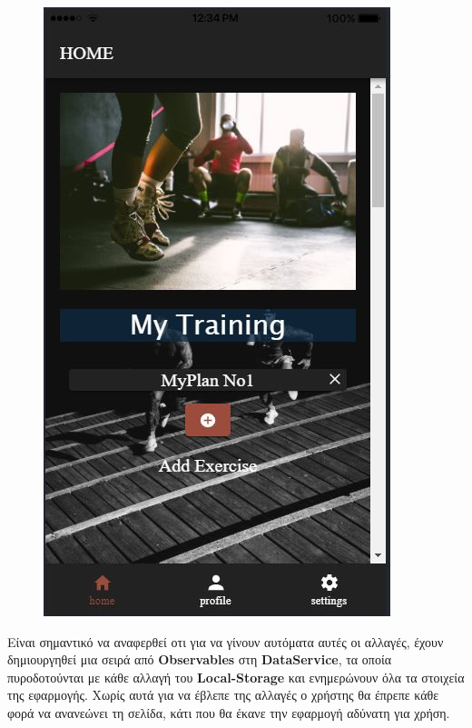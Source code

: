 \documentclass[a4paper,12pt]{article}
\begin{document}
\begin{figure}[!htb]
				\endminipage\hfill
				  \includegraphics[width=\linewidth]{plan6}
				\endminipage\hfill

			\end{figure}
			\vspace*{1cm}
			Είναι σημαντικό να αναφερθεί οτι για να γίνουν αυτόματα αυτές οι αλλαγές, έχουν δημιουργηθεί μια σειρά από 
			\textbf{Observables} στη \textbf{DataService}, τα οποία πυροδοτούνται με κάθε αλλαγή του \textbf{Local-Storage} και ενημερώνουν όλα τα στοιχεία της εφαρμογής. 
			Χωρίς αυτά για να έβλεπε της αλλαγές ο χρήστης θα έπρεπε κάθε φορά να ανανεώνει τη σελίδα, κάτι που θα έκανε 
			την εφαρμογή αδύνατη για χρήση.
\end{document}
